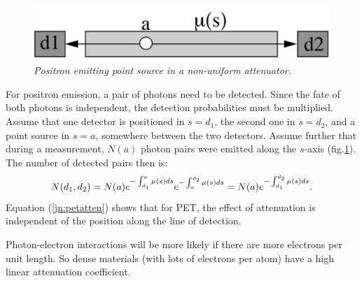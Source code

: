 \begin{figure}[tb]
\centering
\includegraphics[width=\figone]{figs/fig_jnpetatten.pdf}
\caption{\label{fig:jn_petatten} \emph{Positron emitting point source in a
non-uniform attenuator.}}
\end{figure}
For positron emission, a pair of photons need to be detected. Since the fate
of both photons is independent, the detection probabilities must be
multiplied.  Assume that one detector is positioned in $s = d_1$, the second
one in $s = d_2$, and a point source in $s = a$, somewhere between the two
detectors. Assume further that during a measurement, $N(a)$ photon pairs were
emitted along the $s$-axis (fig.\ref{fig:jn_petatten}). The number of
detected pairs then is:
\begin{equation}
  N(d_1,d_2) = N(a)  e^{- \int_{d_1}^a \mu(s) ds} e^{- \int_a^{d_2} \mu(s)
             ds} \\
             = N(a)  e^{- \int_{d_1}^{d_2} \mu(s) ds}. \\
\label{jn:petatten}
\end{equation}
Equation (\ref{jn:petatten}) shows that for PET, the effect of attenuation is
independent of the position along the line of detection.

Photon-electron interactions will be more likely if there are more electrons
per unit length. So dense materials (with lots of electrons per atom) have a
high linear attenuation coefficient.